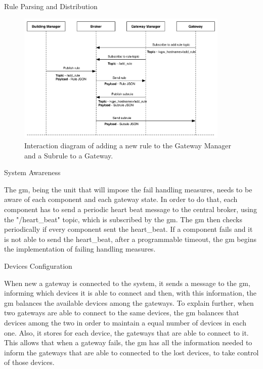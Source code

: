\begin{Paragraph}{Rule Parsing and Distribution}
\begin{figure}[H]
	\centering
	\includegraphics[width=0.9\textwidth]{figures/addrule.png}
	\caption{Interaction diagram of adding a new rule to the Gateway Manager and a Subrule to a Gateway.}
	\label{fig:addrule}
\end{figure}



\end{Paragraph}

\begin{Paragraph}{System Awareness}

The \ac{gm}, being the unit that will impose the fail handling measures, needs to be aware of each component and each gateway state. In order to do that, each component has to send a periodic heart beat message to the central broker, using the "/heart\_beat" topic, which is subscribed by the \ac{gm}. The \ac{gm} then checks periodically if every component sent the heart\_beat. If a component fails and it is not able to send the heart\_beat, after a programmable timeout, the \ac{gm} begins the implementation of failing handling measures.

\end{Paragraph}

\begin{Paragraph}{Devices Configuration}

When new a gateway is connected to the system, it sends a message to the \ac{gm}, informing which devices it is able to connect and then, with this information, the \ac{gm} balances the available devices among the gateways. To explain further, when two gateways are able to connect to the same devices, the \ac{gm} balances that devices among the two in order to maintain a equal number of devices in each one. Also, it stores for each device, the gateways that are able to connect to it. This allows that when a gateway fails, the \ac{gm} has all the information needed to inform the gateways that are able to connected to the lost devices, to take control of those devices.

\end{Paragraph}

